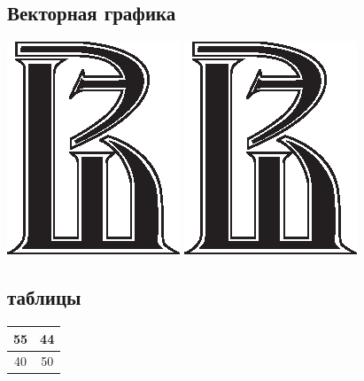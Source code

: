 \documentclass[a4paper,12pt]{article}
\begin{document}
\subsection{Векторная графика}
\includegraphics{logo.eps} %
\includegraphics[width=\textwidth]{logo.eps} %

\par
\subsection{таблицы}
\begin{center}
	\begin{tabular}{c||c}
		\hline55&44\\ 
		\hline40&50\\
		\hline
	\end{tabular} 
\end{center}
\end{document}

